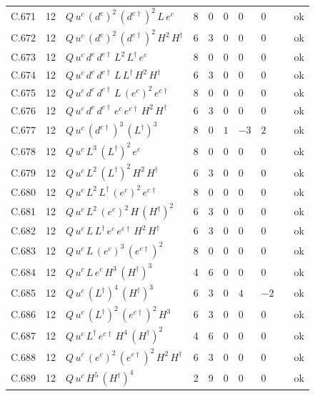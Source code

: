 {\begin{longtable}{@{}ll>{\raggedright\arraybackslash}p{6.4cm}rrllllr@{}}
C.671 & 12 & $Q\,u^c\,(d^c)^{2}\,(d^{c\dagger})^{2}\,L\,e^c$ & 8 & 0 & $0$ & $0$ & $0$ &  & ok \\
C.672 & 12 & $Q\,u^c\,(d^c)^{2}\,(d^{c\dagger})^{2}\,H^{2}\,H^\dagger$ & 6 & 3 & $0$ & $0$ & $0$ &  & ok \\
C.673 & 12 & $Q\,u^c\,d^c\,d^{c\dagger}\,L^{2}\,L^\dagger\,e^c$ & 8 & 0 & $0$ & $0$ & $0$ &  & ok \\
C.674 & 12 & $Q\,u^c\,d^c\,d^{c\dagger}\,L\,L^\dagger\,H^{2}\,H^\dagger$ & 6 & 3 & $0$ & $0$ & $0$ &  & ok \\
C.675 & 12 & $Q\,u^c\,d^c\,d^{c\dagger}\,L\,(e^c)^{2}\,e^{c\dagger}$ & 8 & 0 & $0$ & $0$ & $0$ &  & ok \\
C.676 & 12 & $Q\,u^c\,d^c\,d^{c\dagger}\,e^c\,e^{c\dagger}\,H^{2}\,H^\dagger$ & 6 & 3 & $0$ & $0$ & $0$ &  & ok \\
C.677 & 12 & $Q\,u^c\,(d^{c\dagger})^{3}\,(L^\dagger)^{3}$ & 8 & 0 & $1$ & $-3$ & $2$ &  & ok \\
C.678 & 12 & $Q\,u^c\,L^{3}\,(L^\dagger)^{2}\,e^c$ & 8 & 0 & $0$ & $0$ & $0$ &  & ok \\
C.679 & 12 & $Q\,u^c\,L^{2}\,(L^\dagger)^{2}\,H^{2}\,H^\dagger$ & 6 & 3 & $0$ & $0$ & $0$ &  & ok \\
C.680 & 12 & $Q\,u^c\,L^{2}\,L^\dagger\,(e^c)^{2}\,e^{c\dagger}$ & 8 & 0 & $0$ & $0$ & $0$ &  & ok \\
C.681 & 12 & $Q\,u^c\,L^{2}\,(e^c)^{2}\,H\,(H^\dagger)^{2}$ & 6 & 3 & $0$ & $0$ & $0$ &  & ok \\
C.682 & 12 & $Q\,u^c\,L\,L^\dagger\,e^c\,e^{c\dagger}\,H^{2}\,H^\dagger$ & 6 & 3 & $0$ & $0$ & $0$ &  & ok \\
C.683 & 12 & $Q\,u^c\,L\,(e^c)^{3}\,(e^{c\dagger})^{2}$ & 8 & 0 & $0$ & $0$ & $0$ &  & ok \\
C.684 & 12 & $Q\,u^c\,L\,e^c\,H^{3}\,(H^\dagger)^{3}$ & 4 & 6 & $0$ & $0$ & $0$ &  & ok \\
C.685 & 12 & $Q\,u^c\,(L^\dagger)^{4}\,(H^\dagger)^{3}$ & 6 & 3 & $0$ & $4$ & $-2$ &  & ok \\
C.686 & 12 & $Q\,u^c\,(L^\dagger)^{2}\,(e^{c\dagger})^{2}\,H^{3}$ & 6 & 3 & $0$ & $0$ & $0$ &  & ok \\
C.687 & 12 & $Q\,u^c\,L^\dagger\,e^{c\dagger}\,H^{4}\,(H^\dagger)^{2}$ & 4 & 6 & $0$ & $0$ & $0$ &  & ok \\
C.688 & 12 & $Q\,u^c\,(e^c)^{2}\,(e^{c\dagger})^{2}\,H^{2}\,H^\dagger$ & 6 & 3 & $0$ & $0$ & $0$ &  & ok \\
C.689 & 12 & $Q\,u^c\,H^{5}\,(H^\dagger)^{4}$ & 2 & 9 & $0$ & $0$ & $0$ &  & ok \\

\end{longtable}}
